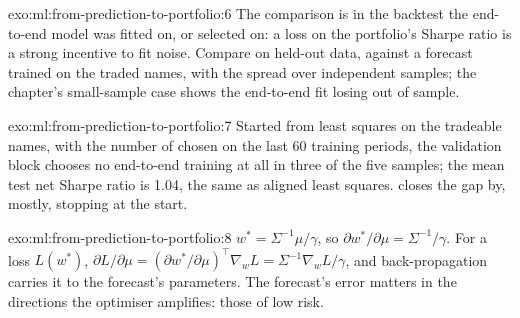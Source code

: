 \begin{solution}{exo:ml:from-prediction-to-portfolio:6}
The comparison is in the backtest the end-to-end model was fitted on, or selected on: a loss on the portfolio's Sharpe ratio
is a strong incentive to fit noise. Compare on held-out data, against a forecast trained on the traded names, with the spread
over independent samples; the chapter's small-sample case shows the end-to-end fit losing out of sample.
\end{solution}

\begin{solution}{exo:ml:from-prediction-to-portfolio:7}
Started from least squares on the tradeable names, with the number of  chosen on the last 60 training periods, the
validation block chooses no end-to-end training at all in three of the five samples; the mean test net Sharpe ratio is 1.04,
the same as aligned least squares.  closes the gap by, mostly, stopping at the start.
\end{solution}

\begin{solution}{exo:ml:from-prediction-to-portfolio:8}
$w^* = \Sigma^{-1}\mu/\gamma$, so $\partial w^*/\partial\mu = \Sigma^{-1}/\gamma$. For a loss $L(w^*)$, $\partial L/\partial\mu =
(\partial w^*/\partial\mu)^\top\nabla_wL = \Sigma^{-1}\nabla_wL/\gamma$, and back-propagation carries it to the forecast's
parameters. The forecast's error matters in the directions the optimiser amplifies: those of low risk.
\end{solution}

